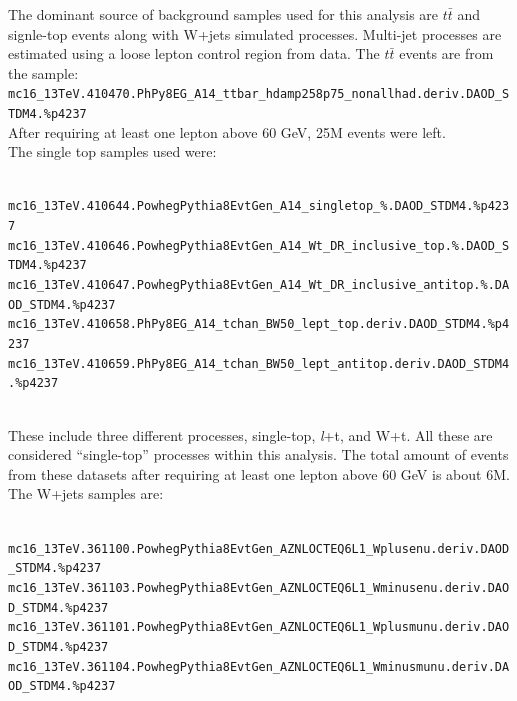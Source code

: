 The dominant source of background samples used for this analysis are $t\bar{t}$ and signle-top events along with W+jets simulated processes. Multi-jet processes are estimated using a loose 
lepton control region from data. The $t\bar{t}$ events are from the sample:
\\
{\footnotesize \texttt{mc16\_13TeV.410470.PhPy8EG\_A14\_ttbar\_hdamp258p75\_nonallhad.deriv.DAOD\_STDM4.\%p4237}}
\\
After requiring at least one lepton above 60 GeV, 25M events were left. 
\\
The single top samples used were:
\\
\\
\begin{footnotesize}
\texttt{mc16\_13TeV.410644.PowhegPythia8EvtGen\_A14\_singletop\_\%.DAOD\_STDM4.\%p4237}\\
\texttt{mc16\_13TeV.410646.PowhegPythia8EvtGen\_A14\_Wt\_DR\_inclusive\_top.\%.DAOD\_STDM4.\%p4237}\\
\texttt{mc16\_13TeV.410647.PowhegPythia8EvtGen\_A14\_Wt\_DR\_inclusive\_antitop.\%.DAOD\_STDM4.\%p4237}\\
\texttt{mc16\_13TeV.410658.PhPy8EG\_A14\_tchan\_BW50\_lept\_top.deriv.DAOD\_STDM4.\%p4237}\\
\texttt{mc16\_13TeV.410659.PhPy8EG\_A14\_tchan\_BW50\_lept\_antitop.deriv.DAOD\_STDM4.\%p4237}\\
\end{footnotesize}
\\
These include three different processes, single-top, \textit{l}+t, and W+t. All these are considered ``single-top'' processes within this analysis. 
The total amount of events from these datasets after requiring at least one lepton above 60 GeV is about 6M. 
\\
The W+jets samples are: 
\\
\\
\begin{footnotesize}
\texttt{mc16\_13TeV.361100.PowhegPythia8EvtGen\_AZNLOCTEQ6L1\_Wplusenu.deriv.DAOD\_STDM4.\%p4237}\\
\texttt{mc16\_13TeV.361103.PowhegPythia8EvtGen\_AZNLOCTEQ6L1\_Wminusenu.deriv.DAOD\_STDM4.\%p4237}\\
\texttt{mc16\_13TeV.361101.PowhegPythia8EvtGen\_AZNLOCTEQ6L1\_Wplusmunu.deriv.DAOD\_STDM4.\%p4237}\\
\texttt{mc16\_13TeV.361104.PowhegPythia8EvtGen\_AZNLOCTEQ6L1\_Wminusmunu.deriv.DAOD\_STDM4.\%p4237}\\
\end{footnotesize}
